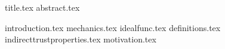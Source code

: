 \documentclass[11pt]{llncs}
\begin{document}
{title.tex}
\thispagestyle{plain}
{abstract.tex}

{introduction.tex}
{mechanics.tex}
{idealfunc.tex}
{definitions.tex}
{indirecttrustproperties.tex}
{motivation.tex}

\end{document}

